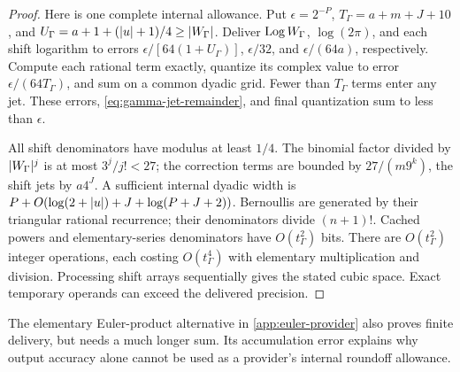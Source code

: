 \begin{proof}
Here is one complete internal allowance. Put \(\epsilon=2^{-P}\),
\(T_\Gamma=a+m+J+10\), and
\(U_\Gamma=a+1+(\lvert u\rvert+1)/4\ge\lvert W_\Gamma\rvert\).
Deliver \(\operatorname{Log} W_\Gamma\), \(\log(2\pi)\), and each shift logarithm
to errors \(\epsilon/[64(1+U_\Gamma)]\), \(\epsilon/32\), and
\(\epsilon/(64a)\), respectively. Compute each rational term exactly,
quantize its complex value to error \(\epsilon/(64T_\Gamma)\), and
sum on a common dyadic grid. Fewer than \(T_\Gamma\) terms enter any
jet. These errors, \eqref{eq:gamma-jet-remainder}, and final quantization
sum to less than \(\epsilon\).

All shift denominators have modulus at least \(1/4\). The binomial
factor divided by \(\lvert W_\Gamma\rvert^j\) is at most \(3^j/j!<27\);
the correction terms are bounded by \(27/(m9^k)\), the shift jets
by \(a4^J\). A sufficient internal dyadic width is
\(P+O(\log(2+\lvert u\rvert)+J+\log(P+J+2))\).
Bernoullis are generated by their triangular rational recurrence;
their denominators divide \((n+1)!\). Cached powers and elementary-series
denominators have \(O(t_\Gamma^2)\) bits. There are
\(O(t_\Gamma^2)\) integer operations, each costing
\(O(t_\Gamma^4)\) with elementary multiplication and division.
Processing shift arrays sequentially gives the stated cubic space.
Exact temporary operands can exceed the delivered precision.
\end{proof}
The elementary Euler-product alternative in \cref{app:euler-provider}
also proves finite delivery, but needs a much longer sum.
Its accumulation error explains why output accuracy alone cannot be
used as a provider's internal roundoff allowance.

